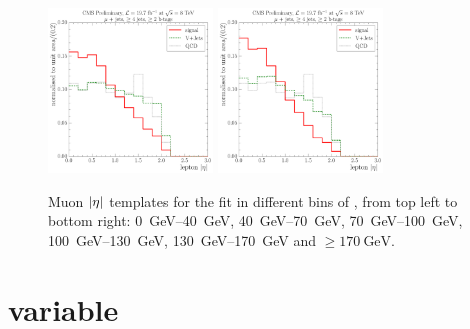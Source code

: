 \begin{figure}[!htbp]
    \hspace*{\fill} \\
    \hspace*{\fill}
    {\includegraphics[width=0.39\textwidth]{measurement/WPT/central/fit_templates/muon_templates_bin_130-170}}\hfill
    {\includegraphics[width=0.39\textwidth]{measurement/WPT/central/fit_templates/muon_templates_bin_170-inf}}
    \hspace*{\fill}
    \caption{Muon $\lvert \eta \rvert$ templates for the fit in different bins of \WPT,
    from top left to bottom right: \SIrange{0}{40}{\GeV}, \SIrange{40}{70}{\GeV},
    \SIrange{70}{100}{\GeV}, \SIrange{100}{130}{\GeV}, \SIrange{130}{170}{\GeV} and $\geq \SI{170}{\GeV}$.}
    \label{fig:fit_templates_WPT_muon}
\end{figure}


\newpage
\section*{\MT variable}

